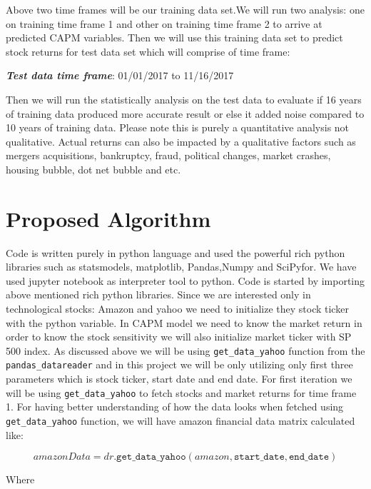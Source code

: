 \indent
Above two time frames will be our training data set.We will run two analysis: one on training time frame 1 and other on training time frame 2 to arrive at predicted
CAPM variables. Then we will use this training data set to predict stock returns for test data set which will comprise of time frame:

\begin{algorithm}
\textbf{\textit{Test data time frame}}: 01/01/2017 to 11/16/2017\newline
\end{algorithm}

Then we will run the statistically analysis on the test data to evaluate if 16 years of training data produced more accurate result or else it added noise compared
to 10 years of training data. Please note this is purely a quantitative analysis not qualitative. Actual returns can also be impacted by a qualitative factors
such as mergers acquisitions, bankruptcy, fraud, political changes, market crashes, housing bubble, dot net bubble and etc.  

\section{Proposed Algorithm}

Code is written purely in python language and used the powerful rich python libraries such as statsmodels, matplotlib, Pandas,Numpy and SciPyfor. 
We have used jupyter notebook as interpreter tool to python. Code is started by importing above mentioned rich python libraries. Since we are interested 
only in technological stocks: Amazon and yahoo we need to initialize they stock ticker with the python variable. In CAPM model we need to know the market
return in order to know the stock sensitivity we will also initialize market ticker with SP 500 index. As discussed above we will be using \texttt{get\_data\_yahoo} 
function from the \texttt{pandas\_datareader} and in this project we will be only utilizing only first three parameters which is stock ticker, start date and 
end date. For first iteration we will be using \texttt{get\_data\_yahoo}  to fetch stocks and market returns for time frame 1. For having better understanding 
of how the data looks when fetched using \texttt{get\_data\_yahoo}  function, we will have amazon financial data matrix calculated like:

$$amazonData = dr.\texttt{get\_data\_yahoo}(amazon,\texttt{start\_date},\texttt{end\_date})$$

\indent
Where 
\indent


